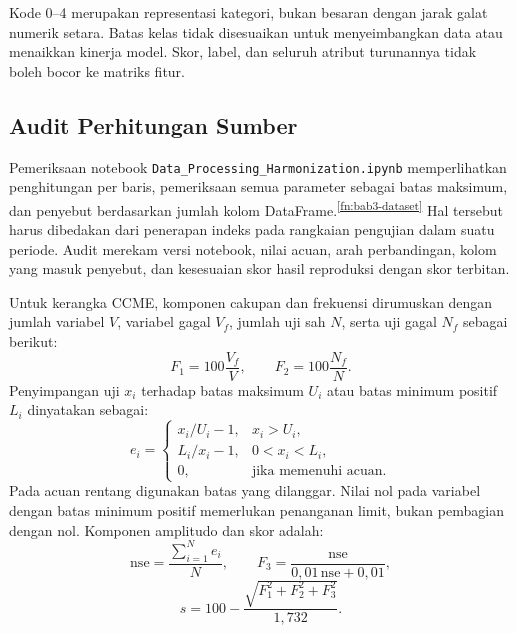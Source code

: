 Kode 0--4 merupakan representasi kategori, bukan besaran dengan jarak galat numerik setara. Batas kelas tidak disesuaikan untuk menyeimbangkan data atau menaikkan kinerja model. Skor, label, dan seluruh atribut turunannya tidak boleh bocor ke matriks fitur.

\subsection{Audit Perhitungan Sumber}

Pemeriksaan notebook \texttt{Data\_Processing\_Harmonization.ipynb} memperlihatkan penghitungan per baris, pemeriksaan semua parameter sebagai batas maksimum, dan penyebut berdasarkan jumlah kolom DataFrame.\textsuperscript{\ref{fn:bab3-dataset}} Hal tersebut harus dibedakan dari penerapan indeks pada rangkaian pengujian dalam suatu periode. Audit merekam versi notebook, nilai acuan, arah perbandingan, kolom yang masuk penyebut, dan kesesuaian skor hasil reproduksi dengan skor terbitan.

Untuk kerangka CCME, komponen cakupan dan frekuensi dirumuskan dengan jumlah variabel $V$, variabel gagal $V_f$, jumlah uji sah $N$, serta uji gagal $N_f$ sebagai berikut:
\begin{equation}
    F_1=100\frac{V_f}{V},\qquad F_2=100\frac{N_f}{N}.
    \label{eq:bab3-faktor}
\end{equation}
Penyimpangan uji $x_i$ terhadap batas maksimum $U_i$ atau batas minimum positif $L_i$ dinyatakan sebagai:
\begin{equation}
    e_i=\begin{cases}
        x_i/U_i-1,&x_i>U_i,\\
        L_i/x_i-1,&0<x_i<L_i,\\
        0,&\text{jika memenuhi acuan}.
    \end{cases}
    \label{eq:bab3-excursion}
\end{equation}
Pada acuan rentang digunakan batas yang dilanggar. Nilai nol pada variabel dengan batas minimum positif memerlukan penanganan limit, bukan pembagian dengan nol. Komponen amplitudo dan skor adalah:
\begin{equation}
    \mathrm{nse}=\frac{\sum_{i=1}^{N}e_i}{N},\qquad
    F_3=\frac{\mathrm{nse}}{0{,}01\,\mathrm{nse}+0{,}01},
    \label{eq:bab3-amplitudo}
\end{equation}
\begin{equation}
    s=100-\frac{\sqrt{F_1^2+F_2^2+F_3^2}}{1{,}732}.
    \label{eq:bab3-wqi}
\end{equation}

